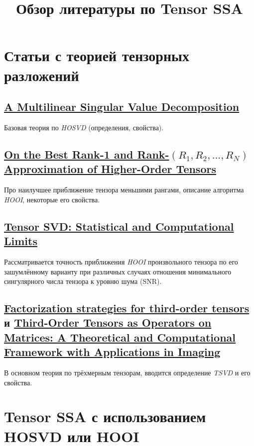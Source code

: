 \documentclass[12pt]{article}
\theoremstyle{plain}
\theoremstyle{definition}
\theoremstyle{remark}
\newcommand{\HOSVD}{\emph{HOSVD}}
\newcommand{\HOOI}{\emph{HOOI}}
\newcommand{\TSVD}{\emph{TSVD}}
\begin{document}
\title{Обзор литературы по Tensor SSA}
\date{}
\author{}
\maketitle
\section{Статьи с теорией тензорных разложений}
\subsection{\href{https://doi.org/10.1137/s0895479896305696}
{A Multilinear Singular Value Decomposition}}\label{DeLathauwer2000}
Базовая теория
по \HOSVD{} (определения, свойства).

\subsection{\href{https://doi.org/10.1137/s0895479898346995}{On the Best
    Rank-1 and Rank-\texorpdfstring{$(R_1 ,R_2 ,. . .,R_N)$}{(R1, R2,
..., RN)} Approximation of Higher-Order Tensors}}\label{DeLathauwer2000a}
Про наилучшее приближение тензора
меньшими рангами, описание алгоритма \HOOI{}, некоторые его свойства.

\subsection{\href{https://doi.org/10.1109/TIT.2018.2841377}{Tensor SVD:
Statistical and Computational Limits}}
Рассматривается
точность приближения \HOOI{} произвольного тензора по его
зашумлённому варианту при различных случаях отношения минимального
сингулярного числа тензора к уровню шума (SNR).

\subsection{
  \href{https://doi.org/10.1016/j.laa.2010.09.020}{Factorization
  strategies for third-order tensors} и
  \href{https://doi.org/10.1137/110837711}{Third-Order
    Tensors as Operators on Matrices: A Theoretical and Compu\-tational
Framework with Applications in Imaging}}\label{Kilmer2011}
В основном теория по
трёхмерным тензорам,
вводится определение \TSVD{} и его свойства.

\section{Tensor SSA с использованием HOSVD или HOOI}
\end{document}
